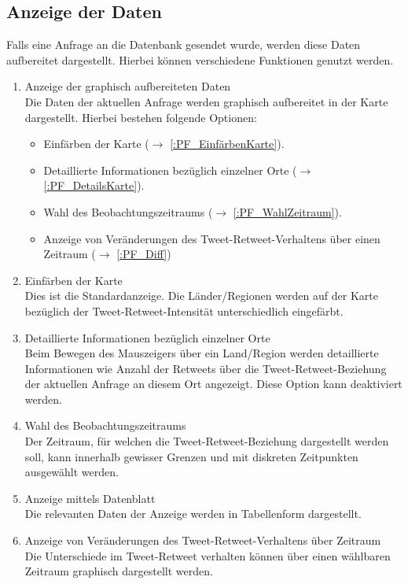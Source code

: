 \subsection{Anzeige der Daten}	
Falls eine Anfrage an die Datenbank gesendet wurde, werden diese Daten aufbereitet dargestellt. Hierbei können verschiedene Funktionen genutzt werden.
\begin{enumerate}[ align=left, label={\textbf{\textbackslash F20\arabic*0\textbackslash}} ]	
	\item Anzeige der graphisch aufbereiteten Daten \\
	Die Daten der aktuellen Anfrage werden graphisch aufbereitet in der Karte dargestellt.
	Hierbei bestehen folgende Optionen:
	\begin{itemize}
		\item Einfärben der Karte ($\rightarrow$ \ref{:PF_EinfärbenKarte}).
		\item Detaillierte Informationen bezüglich einzelner Orte ($\rightarrow$ \ref{:PF_DetailsKarte}).
		\item Wahl des Beobachtungszeitraums ($\rightarrow$ \ref{:PF_WahlZeitraum}).
		\item Anzeige von Veränderungen des Tweet-Retweet-Verhaltens über einen Zeitraum ($\rightarrow$ \ref{:PF_Diff})
	\end{itemize}
	
	\item Einfärben der Karte \label{:PF_EinfärbenKarte} \\
	Dies ist die Standardanzeige. Die Länder/Regionen werden auf der Karte bezüglich der Tweet-Retweet-Intensität unterschiedlich eingefärbt.
	\item Detaillierte Informationen bezüglich einzelner Orte \label{:PF_DetailsKarte} \\
	Beim Bewegen des Mauszeigers über ein Land/Region werden detaillierte Informationen wie Anzahl der Retweets über die Tweet-Retweet-Beziehung der aktuellen Anfrage an diesem Ort angezeigt. Diese Option kann deaktiviert werden.
	\item Wahl des Beobachtungszeitraums \label{:PF_WahlZeitraum} \\
	Der Zeitraum, für welchen die Tweet-Retweet-Beziehung dargestellt werden soll, kann innerhalb gewisser Grenzen und mit diskreten Zeitpunkten ausgewählt werden.
	
	\item Anzeige mittels Datenblatt \label{:PF_AnzeigeDatenblatt} \\
	Die relevanten Daten der Anzeige werden in Tabellenform dargestellt.
	
	\item Anzeige von Veränderungen des Tweet-Retweet-Verhaltens über Zeitraum \label{:PF_Diff} \\
	Die Unterschiede im Tweet-Retweet verhalten können über einen wählbaren Zeitraum graphisch dargestellt werden.
\end{enumerate}

